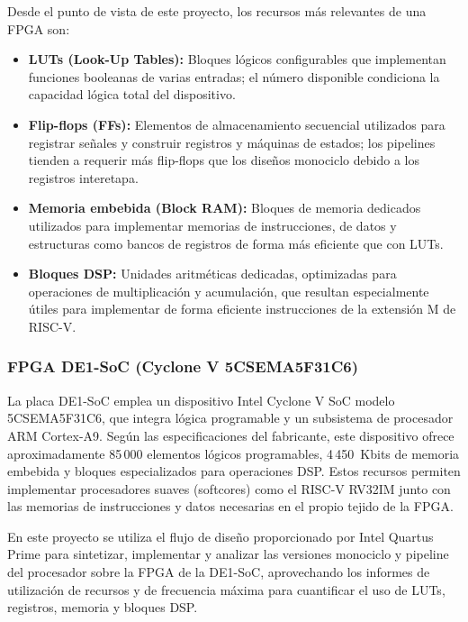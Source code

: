 Desde el punto de vista de este proyecto, los recursos más relevantes de una FPGA son:
\begin{itemize}
  \item \textbf{LUTs (Look-Up Tables):} Bloques lógicos configurables que implementan funciones booleanas de varias entradas; el número disponible condiciona la capacidad lógica total del dispositivo.
  \item \textbf{Flip-flops (FFs):} Elementos de almacenamiento secuencial utilizados para registrar señales y construir registros y máquinas de estados; los pipelines tienden a requerir más flip-flops que los diseños monociclo debido a los registros interetapa.
  \item \textbf{Memoria embebida (Block RAM):} Bloques de memoria dedicados utilizados para implementar memorias de instrucciones, de datos y estructuras como bancos de registros de forma más eficiente que con LUTs.\parencite{intel2016cyclone}
  \item \textbf{Bloques DSP:} Unidades aritméticas dedicadas, optimizadas para operaciones de multiplicación y acumulación, que resultan especialmente útiles para implementar de forma eficiente instrucciones de la extensión M de RISC-V.\parencite{intel2018variable}
\end{itemize}


\subsubsection{FPGA DE1-SoC (Cyclone V 5CSEMA5F31C6)}

La placa DE1-SoC emplea un dispositivo Intel Cyclone V SoC modelo 5CSEMA5F31C6, que integra lógica programable y un subsistema de procesador ARM Cortex-A9. Según las especificaciones del fabricante, este dispositivo ofrece aproximadamente 85\,000 elementos lógicos programables, 4\,450~Kbits de memoria embebida y bloques especializados para operaciones DSP.\parencite{terasicDE1SoC,intel2016cyclone}
Estos recursos permiten implementar procesadores suaves (softcores) como el RISC-V RV32IM junto con las memorias de instrucciones y datos necesarias en el propio tejido de la FPGA.

En este proyecto se utiliza el flujo de diseño proporcionado por Intel Quartus Prime para sintetizar, implementar y analizar las versiones monociclo y pipeline del procesador sobre la FPGA de la DE1-SoC, aprovechando los informes de utilización de recursos y de frecuencia máxima para cuantificar el uso de LUTs, registros, memoria y bloques DSP.\parencite{intel2016cyclone}



